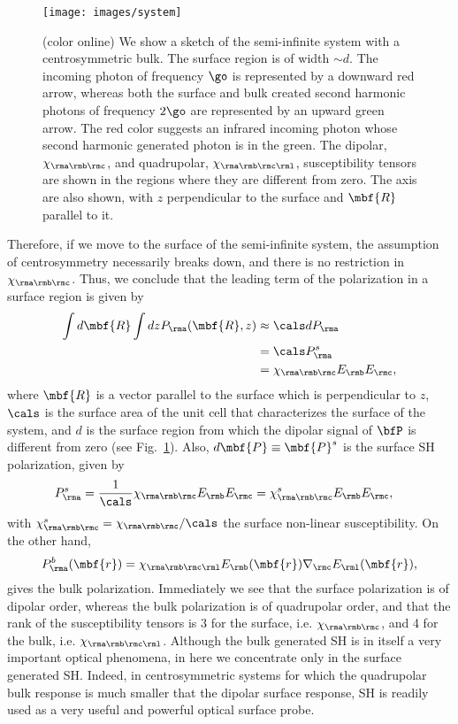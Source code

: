 \documentclass[floatfix,prb,aps,superscriptaddress,11pt,preprint,letterpaper]{revtex4}
\begin{document}
\begin{figure}[t]
\centering
\texttt{[image: images/system]}
\caption{(color online) We show a sketch of the 
semi-infinite system with a centrosymmetric bulk. The surface region is
of width $\sim d$. The incoming photon of frequency $\go$ is represented by
a downward red arrow, whereas both the surface and bulk created second
harmonic photons of frequency $2\go$ are represented by an upward
green arrow. The red color suggests an infrared incoming photon whose
second harmonic generated photon is in the green. The dipolar,
$\chi_{\rma\rmb\rmc}$, and 
quadrupolar, $\chi_{\rma\rmb\rmc\rml}$, susceptibility tensors are shown in the regions where they
are different from zero. The axis are also shown, with $z$
perpendicular to the surface and $\mbf{R}$ parallel to it.
}
\label{fsystem}
\end{figure}

Therefore, if we move to the surface of the semi-infinite system, the
assumption of centrosymmetry necessarily breaks down, and there is no
restriction in $\chi_{\rma\rmb\rmc}$. Thus, we conclude that the leading term
of the polarization in a surface region is given by
\begin{align}\label{sshgp1}
\int d\mbf{R}\int dz 
P_{\rma}(\mbf{R},z)
&\approx
\cals dP_{\rma}
\nonumber\\
&=
\cals P_{\rma}^{s}
\nonumber\\
&=
\chi_{\rma\rmb\rmc}E_{\rmb}E_{\rmc},
\end{align}
where $\mbf{R}$ is a vector parallel to the surface which is
perpendicular to $z$, $\cals$ is the surface area of the unit
cell that characterizes the surface of the system, and $d$ is the
surface region from which the dipolar signal of $\bfP$ is
different from zero (see Fig.~\ref{fsystem}).
Also, $d\mbf{P}\equiv \mbf{P}^s$ is
the surface SH polarization, given by
\begin{align}\label{sshgp2}
P_{\rma}^{s}&=\frac{1}{\cals}
\chi_{\rma\rmb\rmc}E_{\rmb}E_{\rmc}
=
\chi^s_{\rma\rmb\rmc}E_{\rmb}E_{\rmc},
\end{align}
with $\chi_{\rma\rmb\rmc}^s=\chi_{\rma\rmb\rmc}/\cals$ the surface
non-linear susceptibility. 
On the other hand, 
\begin{equation}\label{sshgp3}
P^b_{\rma}(\mbf{r})=\chi_{\rma\rmb\rmc\rml}E_{\rmb}(\mbf{r})\nabla_{\rmc}
E_{\rml}(\mbf{r}),  
\end{equation}
gives the bulk polarization. Immediately we see that the surface
polarization is of dipolar order, whereas the bulk polarization is of
quadrupolar order, and that the rank of the susceptibility tensors is 3
for the surface, i.e. $\chi_{\rma\rmb\rmc}$, and 4 for the bulk,
i.e. $\chi_{\rma\rmb\rmc\rml}$. 
Although the bulk generated SH is in itself a very important optical
phenomena, in here we concentrate only in the surface generated
SH. Indeed, in centrosymmetric systems for which the quadrupolar bulk
response is much smaller that the dipolar surface response, SH is
readily used as a very useful and powerful optical surface probe.\cite{downer_optical_2001}
\end{document}
